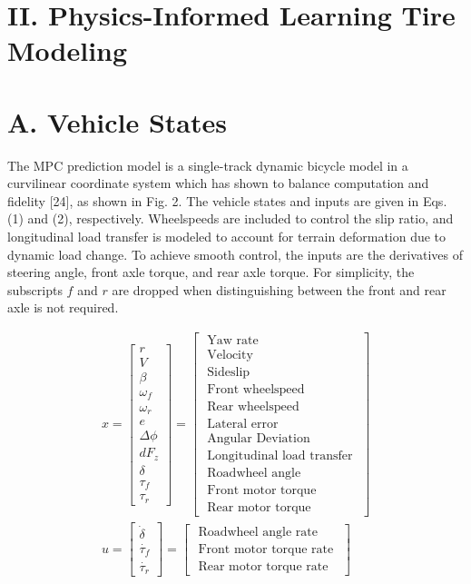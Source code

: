 \documentclass[10pt]{article}
\begin{document}
\section*{II. Physics-Informed Learning Tire Modeling}
\section*{A. Vehicle States}
The MPC prediction model is a single-track dynamic bicycle model in a curvilinear coordinate system which has shown to balance computation and fidelity [24], as shown in Fig. 2. The vehicle states and inputs are given in Eqs. (1) and (2), respectively. Wheelspeeds are included to control the slip ratio, and longitudinal load transfer is modeled to account for terrain deformation due to dynamic load change. To achieve smooth control, the inputs are the derivatives of steering angle, front axle torque, and rear axle torque. For simplicity, the subscripts $f$ and $r$ are dropped when distinguishing between the front and rear axle is not required.


\begin{gather*}
x=\left[\begin{array}{c}
r \\
V \\
\beta \\
\omega_{f} \\
\omega_{r} \\
e \\
\Delta \phi \\
d F_{z} \\
\delta \\
\tau_{f} \\
\tau_{r}
\end{array}\right]=\left[\begin{array}{c}
\text { Yaw rate } \\
\text { Velocity } \\
\text { Sideslip } \\
\text { Front wheelspeed } \\
\text { Rear wheelspeed } \\
\text { Lateral error } \\
\text { Angular Deviation } \\
\text { Longitudinal load transfer } \\
\text { Roadwheel angle } \\
\text { Front motor torque } \\
\text { Rear motor torque }
\end{array}\right]  \tag{1}\\
u=\left[\begin{array}{c}
\dot{\delta} \\
\dot{\tau_{f}} \\
\dot{\tau_{r}}
\end{array}\right]=\left[\begin{array}{c}
\text { Roadwheel angle rate } \\
\text { Front motor torque rate } \\
\text { Rear motor torque rate }
\end{array}\right] \tag{2}
\end{gather*}
\end{document}
